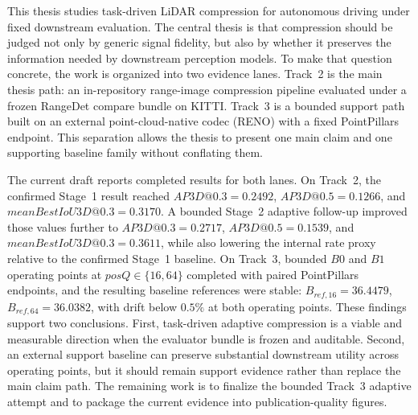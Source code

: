 This thesis studies task-driven LiDAR compression for autonomous driving under fixed downstream evaluation. The central thesis is that compression should be judged not only by generic signal fidelity, but also by whether it preserves the information needed by downstream perception models. To make that question concrete, the work is organized into two evidence lanes. Track~2 is the main thesis path: an in-repository range-image compression pipeline evaluated under a frozen RangeDet compare bundle on KITTI. Track~3 is a bounded support path built on an external point-cloud-native codec (RENO) with a fixed PointPillars endpoint. This separation allows the thesis to present one main claim and one supporting baseline family without conflating them.

The current draft reports completed results for both lanes. On Track~2, the confirmed Stage~1 result reached \(AP3D@0.3=0.2492\), \(AP3D@0.5=0.1266\), and \(meanBestIoU3D@0.3=0.3170\). A bounded Stage~2 adaptive follow-up improved those values further to \(AP3D@0.3=0.2717\), \(AP3D@0.5=0.1539\), and \(meanBestIoU3D@0.3=0.3611\), while also lowering the internal rate proxy relative to the confirmed Stage~1 baseline. On Track~3, bounded \(B0\) and \(B1\) operating points at \(posQ\in\{16,64\}\) completed with paired PointPillars endpoints, and the resulting baseline references were stable: \(B_{ref,16}=36.4479\), \(B_{ref,64}=36.0382\), with drift below \(0.5\%\) at both operating points. These findings support two conclusions. First, task-driven adaptive compression is a viable and measurable direction when the evaluator bundle is frozen and auditable. Second, an external support baseline can preserve substantial downstream utility across operating points, but it should remain support evidence rather than replace the main claim path. The remaining work is to finalize the bounded Track~3 adaptive attempt and to package the current evidence into publication-quality figures.
